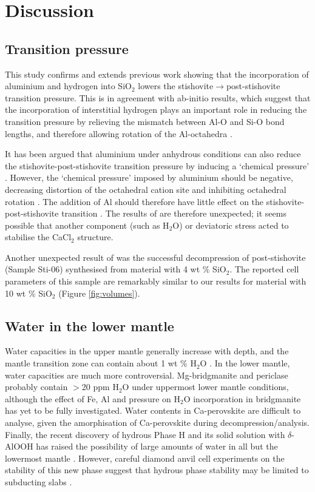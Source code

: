 \documentclass[review]{elsarticle}
\begin{document}
\clearpage

\section{Discussion}
\subsection{Transition pressure}
This study confirms and extends previous work showing that the incorporation of aluminium and hydrogen into SiO$_2$ lowers the stishovite$\rightarrow$post-stishovite transition pressure. This is in agreement with ab-initio results, which suggest that the incorporation of interstitial hydrogen plays an important role in reducing the transition pressure by relieving the mismatch between Al-O and Si-O bond lengths, and therefore allowing rotation of the Al-octahedra \citep{PS2004,UKHRW2015}.

It has been argued that aluminium under anhydrous conditions can also reduce the stishovite-post-stishovite transition pressure by inducing a `chemical pressure' \citep{BAAG2009}. However, the `chemical pressure' imposed by aluminium should be negative, decreasing distortion of the octahedral cation site and inhibiting octahedral rotation \citep{SSP1995, UKHRW2015}. The addition of Al should therefore have little effect on the stishovite-post-stishovite transition \citep{Panero2006}. The results of \cite{BAAG2009} are therefore unexpected; it seems possible that another component (such as H$_2$O) or deviatoric stress acted to stabilise the CaCl$_2$ structure.

Another unexpected result of \cite{BAAG2009} was the successful decompression of post-stishovite (Sample Sti-06) synthesised from material with 4 wt \% SiO$_2$. The reported cell parameters of this sample are remarkably similar to our results for material with 10 wt \% SiO$_2$ (Figure \ref{fig:volumes}).



\subsection{Water in the lower mantle}
Water capacities in the upper mantle generally increase with depth, and the mantle transition zone can contain about 1 wt \% H$_2$O \citep{KB2006}. In the lower mantle, water capacities are much more controversial. Mg-bridgmanite and periclase probably contain $>$20 ppm H$_2$O under uppermost lower mantle conditions, although the effect of Fe, Al and pressure on H$_2$O incorporation in bridgmanite has yet to be fully investigated. Water contents in Ca-perovskite are difficult to analyse, given the amorphisation of Ca-perovskite during decompression/analysis. Finally, the recent discovery of hydrous Phase H \citep{NITTNFH2014, BNTI2014, OAKSH2014} and its solid solution with $\delta$-AlOOH \citep{OOSMHON2014} has raised the possibility of large amounts of water in all but the lowermost mantle \cite{Ohtani2015}. However, careful diamond anvil cell experiments on the stability of this new phase suggest that hydrous phase stability may be limited to subducting slabs \citep{Walteretal2015}.
\end{document}
